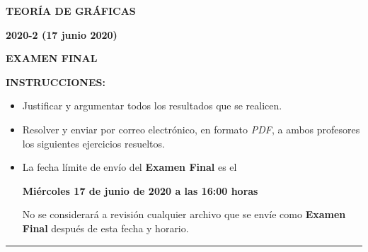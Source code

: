 \documentclass[11pt]{report}
\begin{document}
\pagestyle{empty}

\begin{center}
\textbf{\LARGE {TEORÍA DE GRÁFICAS}}
\end{center}

\begin{center}
\textbf{{\large 2020-2 (17 junio 2020)}}
\end{center}

\begin{center}
\textbf{{\large EXAMEN FINAL}}
\end{center}

{\bf INSTRUCCIONES:}
\begin{itemize}
\item Justificar y argumentar todos los resultados que se realicen.

\item Resolver y enviar por correo electrónico, en formato \textit{PDF}, a ambos profesores los siguientes ejercicios resueltos.

\item La fecha límite de envío del \textbf{Examen Final} es el
\begin{center}
\textbf{Miércoles 17 de junio de 2020 a las 16:00 horas}
\end{center}
No se considerará a revisión cualquier archivo que se envíe como \textbf{Examen Final} después de esta fecha y horario.

\end{itemize}

\begin{center}
\rule[0mm]{20cm}{0.2mm}
\end{center}
\end{document}
